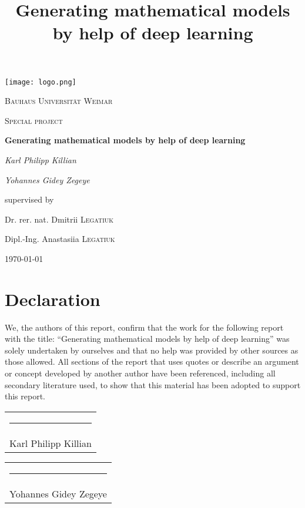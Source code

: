 \documentclass[12pt]{report}
\title{Generating mathematical models by help of deep learning}
\begin{document}
\begin{titlepage}
	\centering
	\texttt{[image: logo.png]}\par\vspace{1cm}
	{\scshape\LARGE Bauhaus Universität Weimar \par}
	\vspace{1cm}
	{\scshape\Large Special project\par}
	\vspace{1.5cm}
	{\huge\bfseries Generating mathematical models by help of deep learning\par}
	\vspace{2cm}
	{\Large\itshape Karl Philipp Killian\par}
	{\Large\itshape Yohannes Gidey Zegeye\par}
	\vfill
	supervised by\par
	Dr. rer. nat. Dmitrii  \textsc{Legatiuk}
	\par
    Dipl.-Ing. Anastasiia  \textsc{Legatiuk}
	\vfill

	{\large \today\par}
\end{titlepage}

\chapter*{Declaration}
We, the authors of this report, confirm that the work for the following report with the title: “Generating mathematical models by help of deep learning” was solely undertaken by
ourselves and that no help was provided by other sources as those allowed. All sections of the report that uses quotes or describe an argument or concept developed by another author have been referenced, including all secondary literature used, to show that this material has been adopted to support this report.

\vspace*{4em}\noindent
\hfill%
\begin{tabular}[t]{c}
  \rule{10em}{0.4pt}\\ Karl Philipp Killian
\end{tabular}%
\hfill%
\begin{tabular}[t]{c}
  \rule{10em}{0.4pt}\\ Yohannes Gidey Zegeye
\end{tabular}%
\hfill\strut
\end{document}
